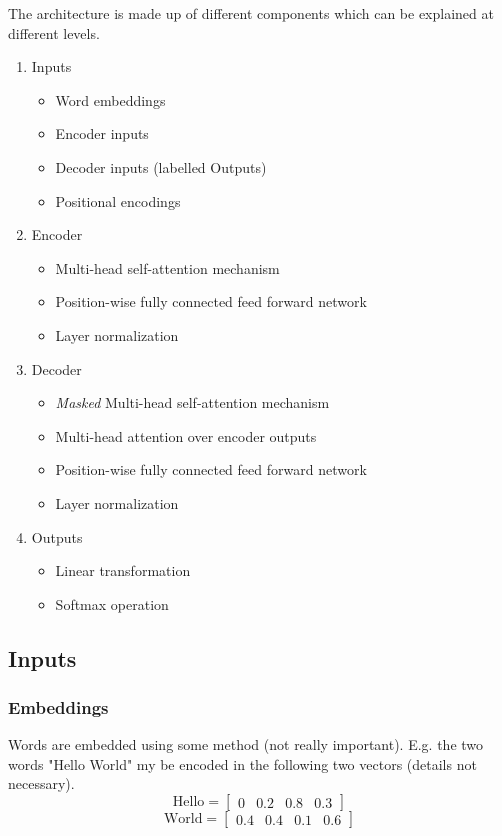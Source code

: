 \documentclass{article}
\begin{document}
    The architecture is made up of different components which can be explained at different levels.
    \pagebreak
    \begin{enumerate}
        \item Inputs
        \begin{itemize}
            \item Word embeddings
            \item Encoder inputs
            \item Decoder inputs (labelled Outputs)
            \item Positional encodings
        \end{itemize}
        \item Encoder
        \begin{itemize}
            \item Multi-head self-attention mechanism
            \item Position-wise fully connected feed forward network
            \item Layer normalization
        \end{itemize}
        \item Decoder
        \begin{itemize}
            \item \emph{Masked} Multi-head self-attention mechanism
            \item Multi-head attention over encoder outputs
            \item Position-wise fully connected feed forward network
            \item Layer normalization
        \end{itemize}
        \item Outputs
        \begin{itemize}
            \item Linear transformation
            \item Softmax operation
        \end{itemize}
    \end{enumerate}
    \subsection{Inputs}
    \subsubsection{Embeddings}
    Words are embedded using some method (not really important). E.g. the two words "Hello World" my be encoded in the following two vectors (details not necessary).
    \[ \text{Hello} = \begin{bmatrix}
        0 & 0.2 & 0.8 & 0.3
    \end{bmatrix} \]
    \[ \text{World} = \begin{bmatrix}
        0.4 & 0.4 & 0.1 & 0.6
    \end{bmatrix} \]
\end{document}
